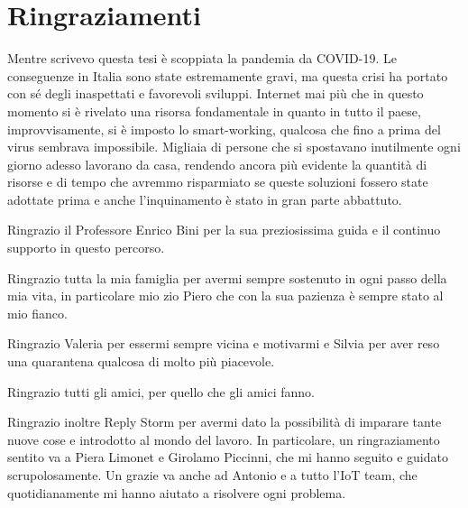 
\chapter{Ringraziamenti}

        
Mentre scrivevo questa tesi è scoppiata la pandemia da COVID-19.
Le conseguenze in Italia 
sono state estremamente gravi, ma questa crisi ha portato con sé degli inaspettati e favorevoli sviluppi.
Internet mai più che in questo momento si è rivelato una risorsa fondamentale in quanto in tutto il paese,
improvvisamente, si è imposto lo smart-working, qualcosa che fino a prima del virus sembrava impossibile.
Migliaia di persone che si spostavano inutilmente ogni giorno adesso lavorano da casa, rendendo ancora più evidente
la quantità di risorse e di tempo che avremmo risparmiato se queste soluzioni fossero state adottate prima e
anche l'inquinamento è stato in gran parte abbattuto.


Ringrazio il Professore Enrico Bini per la sua preziosissima guida e il continuo supporto in questo percorso.

Ringrazio tutta la mia famiglia per avermi sempre sostenuto in ogni passo della mia vita, in particolare mio zio Piero che con la sua pazienza
è sempre stato al mio fianco.

Ringrazio  Valeria per essermi sempre vicina e motivarmi  e Silvia per aver reso una quarantena qualcosa di molto più piacevole.

Ringrazio tutti gli amici, per quello che gli amici fanno.

Ringrazio inoltre Reply Storm per avermi dato la possibilità di imparare tante nuove cose e
introdotto al mondo del lavoro.
In particolare, un ringraziamento sentito va a Piera Limonet e Girolamo Piccinni, che mi hanno seguito
e guidato scrupolosamente. 
Un grazie va anche ad Antonio e a tutto l'IoT team, che quotidianamente mi hanno aiutato a risolvere ogni problema.


